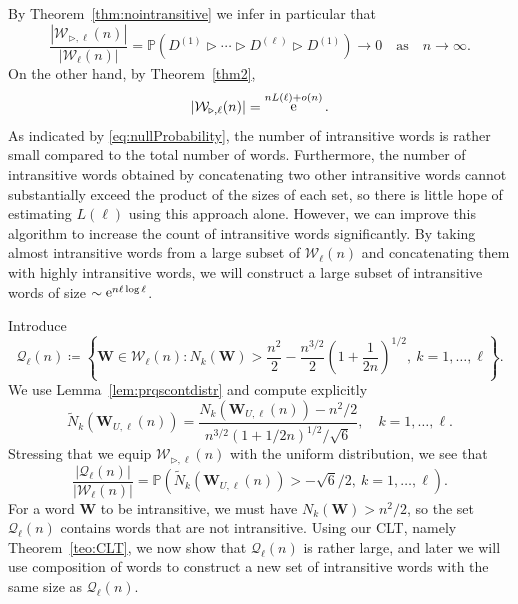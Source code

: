 \documentclass[reqno,a4paper,11pt]{amsart}
\newcommand{\btt}{\triangleright}
\theoremstyle{remark}
\newcommand{\mc}[1]{{\mathcal #1}}
\newcommand{\mb}[1]{{\mathbf #1}}
\newcommand{\bb}[1]{{\mathbb #1}}
\newcommand{\wt}[1]{{\widetilde{#1}}}
\numberwithin{equation}{section}
\DeclareMathOperator{\ee}{\rm e}
\begin{document}
By Theorem~\ref{thm:nointransitive} we infer in particular that
    \begin{equation}\label{eq:nullProbability}
        \frac{|\mc W_{\btt, \ell}(n)|}{|\mc W_{\ell}(n)|}= \bb P\left({D^{(1)} \btt \cdots \btt D^{(\ell)} \btt D^{(1)}}\right) \to 0 \quad\text{as}\quad n\to\infty.
    \end{equation}
%
On the other hand, by Theorem~\ref{thm2}, 
    \[
        |\mc W_{\btt, \ell}(n)| = \ee^{nL(\ell)+o(n)}.
    \]
    As indicated by \eqref{eq:nullProbability}, the number of intransitive words is rather small compared to the total number of words. Furthermore, the number of intransitive words obtained by concatenating two other intransitive words cannot substantially exceed the product of the sizes of each set, so there is little hope of estimating $L(\ell)$ using this approach alone. However, we can improve this algorithm to increase the count of intransitive words significantly. By taking almost intransitive words from a large subset of $\mc W_\ell(n)$ and concatenating them with highly intransitive words, we will construct a large subset of intransitive words of size $\sim \ee^{n\ell \log \ell}$.

Introduce
    \[
        \mc Q_\ell(n)\coloneqq\left\{\mb W \in\mc W_\ell(n): N_{k}(\mb W)>\frac{n^2}{2}-\frac{n^{3/2}}{2}\left(1+\frac{1}{2n}\right)^{1/2},\ k=1, \dots, \ell\right\}.
    \]
We use Lemma~\ref{lem:prqscontdistr} and compute explicitly
    $$
    \wt N_{k}(\mb W_{U,\ell}(n))=\frac{N_{k}(\mb W_{U,\ell}(n))-n^2/2}{n^{3/2}(1+1/2n)^{1/2}/\sqrt{6}},\quad k=1,\hdots, \ell.
    $$
    Stressing that we equip $\mc W_{\btt, \ell}(n)$ with the uniform distribution, we see that
    \begin{equation}\label{eq:sizencQncW}
    \frac{|\mc Q_\ell(n)|}{|\mc W_\ell(n)|}=\bb P\left(\wt N_{k}(\mb W_{U,\ell}(n))>-\sqrt{6}/2,\ k=1, \dots, \ell \right).
    \end{equation}
    For a word $\mb W$ to be intransitive, we must have $N_k(\mb W)>n^2/2$, so the set $\mc Q_\ell(n)$ contains words that are not intransitive. Using our CLT, namely Theorem~\ref{teo:CLT}, we now show that $\mc Q_\ell(n)$ is rather large, and later we will use composition of words to construct a new set of intransitive words with the same size as $\mc Q_\ell(n)$.
    
\end{document}
